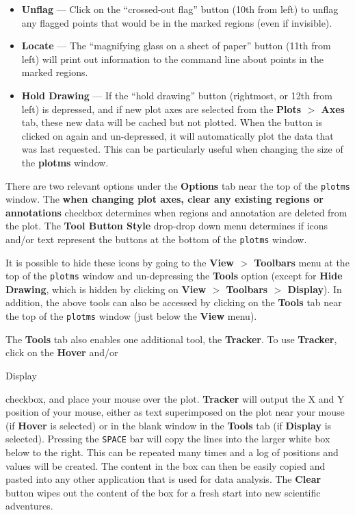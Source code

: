 \begin{itemize}
\item {\bf Unflag} --- Click on the ``crossed-out flag'' button (10th
  from left) to unflag any flagged points that would be in the marked
  regions (even if invisible).

\item {\bf Locate} --- The ``magnifying glass on a sheet of paper''
  button (11th from left) will print out information to the command
  line about points in the marked regions.

\item {\bf Hold Drawing} --- If the ``hold drawing'' button
  (rightmost, or 12th from left) is depressed, and if new plot axes
  are selected from the {\bf Plots $>$ Axes} tab, these new data will
  be cached but not plotted. When the button is clicked on again and
  un-depressed, it will automatically plot the data that was last
  requested. This can be particularly useful when changing the size of
  the {\bf plotms} window.
\end{itemize}

There are two relevant options under the {\bf Options} tab near the
top of the {\tt plotms} window. The {\bf when changing plot axes,
  clear any existing regions or annotations} checkbox determines when
regions and annotation are deleted from the plot. The {\bf Tool Button
  Style} drop-drop down menu determines if icons and/or text represent
the buttons at the bottom of the {\tt plotms} window.

It is possible to hide these icons by going to the {\bf View $>$
  Toolbars} menu at the top of the {\tt plotms} window and
un-depressing the {\bf Tools} option (except for {\bf Hide Drawing},
which is hidden by clicking on {\bf View $>$ Toolbars $>$
  Display}). In addition, the above tools can also be accessed by
clicking on the {\bf Tools} tab near the top of the {\tt plotms}
window (just below the {\bf View} menu).

The {\bf Tools} tab also enables one additional tool, the {\bf
  Tracker}. To use {\bf Tracker}, click on the {\bf Hover} and/or {\bf

  Display} checkbox, and place your mouse over the plot. {\bf Tracker}
will output the X and Y position of your mouse, either as text
superimposed on the plot near your mouse (if {\bf Hover} is selected)
or in the blank window in the {\bf Tools} tab (if {\bf Display} is
selected). Pressing the {\tt SPACE} bar will copy the lines into the
larger white box below to the right. This can be repeated many times
and a log of positions and values will be created. The content in the
box can then be easily copied and pasted into any other application
that is used for data analysis. The {\bf Clear} button wipes out the
content of the box for a fresh start into new scientific adventures.



